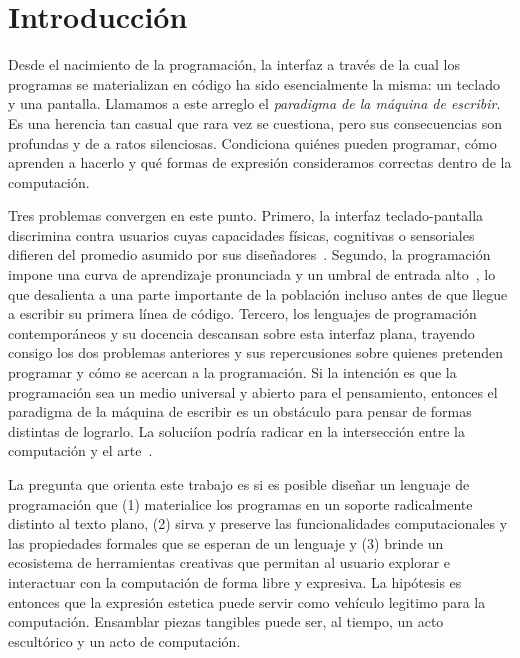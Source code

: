 
\section{Introducci\'on}
\label{sec:introduction}

Desde el nacimiento de la programaci\'on, la
interfaz a trav\'es de la cual los programas se materializan en c\'odigo
ha sido esencialmente la misma: un teclado y una pantalla. Llamamos a
este arreglo el \emph{paradigma de la m\'aquina de escribir}. Es una
herencia tan casual que rara vez se cuestiona, pero sus
consecuencias son profundas y de a ratos silenciosas. Condiciona qui\'enes pueden programar,
c\'omo aprenden a hacerlo y qu\'e formas de expresi\'on consideramos
correctas dentro de la computaci\'on.

Tres problemas convergen en este punto. Primero, la interfaz teclado-pantalla
discrimina contra usuarios cuyas capacidades f\'isicas, cognitivas o
sensoriales difieren del promedio asumido por sus dise\~nadores~\cite{ko23}.
Segundo, la programaci\'on impone una curva de aprendizaje pronunciada y
un umbral de entrada alto~\cite{bosse17gerosa}, lo que desalienta a una
parte importante de la poblaci\'on incluso antes de que llegue a escribir
su primera l\'inea de c\'odigo. Tercero, los lenguajes de programaci\'on 
contempor\'aneos y su docencia descansan sobre esta interfaz plana, trayendo consigo los dos problemas 
anteriores y sus repercusiones sobre quienes pretenden programar y c\'omo se acercan a la programaci\'on.
Si la intenci\'on es que la programaci\'on sea un medio universal y abierto para el pensamiento, entonces 
el paradigma de la m\'aquina de escribir es un obst\'aculo para pensar de formas distintas de lograrlo.
La soluci\'ion podr\'ia radicar en la intersecci\'on entre la computaci\'on y el arte~\cite{hongji16creative}.

La pregunta que orienta este trabajo es si es posible dise\~nar un
lenguaje de programaci\'on que (1) materialice los programas en un
soporte radicalmente distinto al texto plano, (2) sirva y preserve las funcionalidades computacionales y las propiedades
formales que se esperan de un lenguaje  y (3) brinde un ecosistema de herramientas creativas 
que permitan al usuario explorar e interactuar con la computaci\'on de forma libre y expresiva.
La hip\'otesis es entonces que la expresi\'on estetica puede servir 
como veh\'iculo legitimo para la computaci\'on. Ensamblar piezas tangibles puede ser, al tiempo,
un acto escult\'orico y un acto de computaci\'on.


